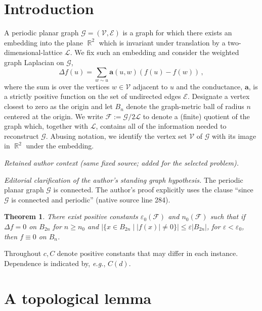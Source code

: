 \documentclass[10pt]{article}
\newcommand{\G}{\mathcal{G}}
\newcommand{\V}{\mathcal{V}}
\newcommand{\E}{\mathcal{E}}
\newcommand{\cond}{\mathbf{a}}
\newcommand{\eps}{\varepsilon}
\DeclareMathOperator{\R}{\mathbb{R}}
\newcommand{\eg}{{\it e.g.}}
\newtheorem{theorem}{Theorem}[section]
\begin{document}
\section{Introduction}\label{sec:intro}
A periodic planar graph $\G = (\V, \E)$ is a graph for which there exists an embedding into the plane $\R^2$ which is invariant under translation by a two-dimensional-lattice $\mathcal{L}$.
We fix such an embedding and consider the weighted graph Laplacian on $\G$,
\[
\Delta f(u) = \sum_{w \sim u} \cond(u,w)( f(u) - f(w)) \,,
\]
where the sum is over the vertices $w \in \V$ adjacent to $u$ and the conductance, $\cond$, is a strictly positive function on the set of undirected edges $\E$. Designate a vertex closest to zero as the origin and let $B_n$ denote the graph-metric ball of radius $n$ centered at the origin. We write $\mathcal{F} := \G / 2\mathcal{L}$ to denote a (finite) quotient of the graph which, together with $\mathcal{L}$, contains all of the information needed to reconstruct $\G$. Abusing notation, we identify the vertex set $\V$ of $\G$ with its image in $\R^2$ under the embedding.
\setcounter{theorem}{2}\setcounter{figure}{1}
\par\medskip\noindent\textit{Retained author context (same fixed source; added for the selected problem).}\par
\noindent\textit{Editorial clarification of the author's standing graph hypothesis.} The periodic planar graph $\G$ is connected. The author's proof explicitly uses the clause ``since~$\G$ is connected and periodic'' (native source line 284).\par\smallskip

\begin{theorem}\label{theorem:zero-case}
	There exist positive constants $\eps_0(\mathcal{F})$ and $n_0(\mathcal{F})$ such that if $\Delta f = 0$ on $B_{2 n}$ for $n \geq n_0$
	and $|\{x \in B_{2n} \mid |f(x)| \neq 0\}| \leq \eps |B_{2n}|$, for $\eps < \eps_0$, then $f \equiv 0$ on $B_n$.
\end{theorem}
Throughout $c, C$ denote positive constants that may differ in each instance. Dependence is indicated by, \eg, $C(d)$. 




\section{A topological lemma}\label{sec:topology}
\end{document}

